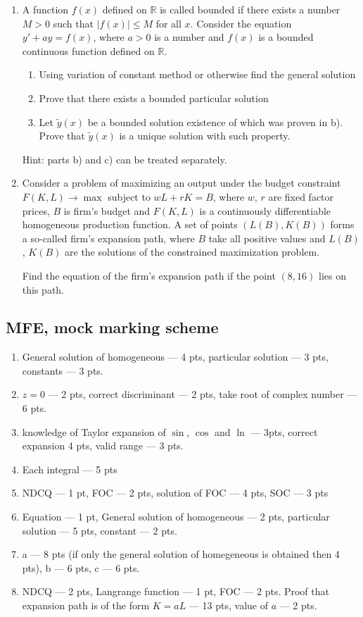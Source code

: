 \begin{enumerate}[resume]
\item A function $f(x)$ defined on $\mathbb{R}$ is called bounded if there exists a number $M>0$ such that $|f(x)| \leq M$ for all $x$. Consider the equation $y'+ ay = f (x)$, where $a>0$ is a number and $f (x)$  is a bounded continuous function defined on $\mathbb{R}$.
\begin{enumerate}
\item Using variation of constant method or otherwise find the general solution
\item  Prove that there exists a bounded particular solution
\item Let $\tilde{y}(x)$  be a bounded solution existence of which was proven in b). Prove that $\tilde{y}(x)$ is a unique solution with such property.
\end{enumerate}
Hint: parts b) and c) can be treated separately.


\item Consider a problem of maximizing an output under the budget constraint $F(K,L) \to \max$ subject to $wL+rK=B$, where $w$, $r$ are fixed factor prices, $B$ is firm's budget and $F(K,L)$ is a continuously differentiable homogeneous production function. A set of points $(L(B),K(B))$ forms a so-called firm's expansion path, where $B$ take all positive values and $L(B)$, $K(B)$ are the solutions of the constrained maximization problem.

Find the equation of the firm's expansion path if the point $(8,16)$ lies on this path.
\end{enumerate}

\subsection{MFE, mock marking scheme}

\begin{enumerate}
\item General solution of homogeneous --- 4 pts, particular solution --- 3 pts, constants --- 3 pts.
\item $z=0$ --- 2 pts, correct discriminant  --- 2 pts, take root of complex number --- 6 pts.
\item knowledge of Taylor expansion of $\sin$, $\cos$ and $\ln$ --- 3pts, correct expansion 4 pts, valid range --- 3 pts.
\item Each integral --- 5 pts
\item NDCQ --- 1 pt, FOC --- 2 pts, solution of FOC --- 4 pts, SOC --- 3 pts
\item Equation --- 1 pt, General solution of homogeneous --- 2 pts, particular solution --- 5 pts, constant --- 2 pts.
\item a --- 8 pts (if only the general solution of homegeneous is obtained then 4 pts), b --- 6 pts, c --- 6 pts.
\item NDCQ --- 2 pts, Langrange function --- 1 pt, FOC --- 2 pts. Proof that expansion path is of the form $K=aL$ --- 13 pts, value of $a$ --- 2 pts.
\end{enumerate}


